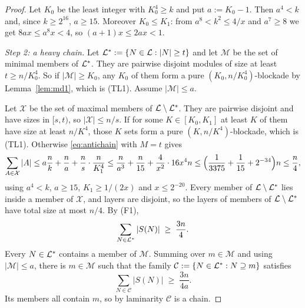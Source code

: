\begin{proof}
Let $K_0$ be the least integer with $K_0^4\ge k$ and put $a:=K_0-1$. Then $a^4<k$ and, since $k\ge2^{16}$,
$a\ge15$. Moreover $K_0\le K_1$: from $a^8<k^2\le4/x$ and $a^7\ge8$ we get $8ax\le a^8x<4$, so $(a+1)x\le
2ax<1$.

\emph{Step 2: a heavy chain.} Let $\mathcal{L}^*:=\{N\in\mathcal{L}:|N|\ge t\}$ and let $\mathcal M$ be the set of minimal
members of $\mathcal{L}^*$. They are pairwise disjoint modules of size at least $t\ge n/K_0^4$. So if $|\mathcal
M|\ge K_0$, any $K_0$ of them form a pure $(K_0,n/K_0^4)$-blockade by Lemma~\ref{lem:md1}, which is (TL1).
Assume $|\mathcal M|\le a$.

Let $\mathcal X$ be the set of maximal members of $\mathcal{L}\setminus\mathcal{L}^*$. They are pairwise disjoint and
have sizes in $[s,t)$, so $|\mathcal X|\le n/s$. If for some $K\in[K_0,K_1]$ at least $K$ of them have size
at least $n/K^4$, those $K$ sets form a pure $(K,n/K^4)$-blockade, which is (TL1). Otherwise
\eqref{eq:antichain} with $M=t$ gives
\[
\sum_{A\in\mathcal X}|A|\le a\frac nk+\frac na+\frac ns\cdot\frac n{K_1^4}
\le\frac{n}{a^3}+\frac n{15}+\frac{4}{x^2}\cdot16x^4n\le\Bigl(\frac1{3375}+\frac1{15}+2^{-34}\Bigr)n\le\frac n4,
\]
using $a^4<k$, $a\ge15$, $K_1\ge1/(2x)$ and $x\le2^{-20}$. Every member of $\mathcal{L}\setminus\mathcal{L}^*$ lies inside a
member of $\mathcal X$, and layers are disjoint, so the layers of members of $\mathcal{L}\setminus\mathcal{L}^*$ have total
size at most $n/4$. By (F1),
\[
\sum_{N\in\mathcal{L}^*}|S(N)|\;\ge\;\frac{3n}4 .
\]
Every $N\in\mathcal{L}^*$ contains a member of $\mathcal M$. Summing over $m\in\mathcal M$ and using $|\mathcal M|\le a$,
there is $m\in\mathcal M$ such that the family $\mathcal C:=\{N\in\mathcal{L}^*:N\supseteq m\}$ satisfies
\[
\sum_{N\in\mathcal C}|S(N)|\;\ge\;\frac{3n}{4a}.
\]
Its members all contain $m$, so by laminarity $\mathcal C$ is a chain.


\end{proof}
